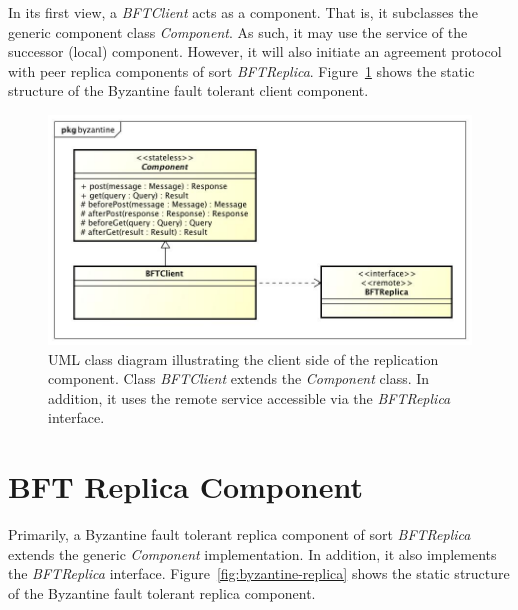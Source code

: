 \documentclass[oneside]{scrreprt}
\newcommand{\fig}[1]{Figure~\ref{#1}}
\begin{document}
In its first view, a \emph{BFTClient} acts as a component.
That is, it subclasses the generic component class
\emph{Component}. As such, it may use the service of
the successor (local) component. However, it will also
initiate an agreement protocol with peer replica
components of sort \emph{BFTReplica}. \fig{fig:byzantine-client}
shows the static structure of the Byzantine fault tolerant client
component.

\begin{figure}[ht]
\centerline{
\includegraphics[width=1.0\textwidth]{figs/byzantine-client}}
\caption{UML class diagram illustrating the client side
of the replication component. Class \emph{BFTClient} extends the
\emph{Component} class. In addition, it uses the remote service
accessible via the \emph{BFTReplica} interface.}
\label{fig:byzantine-client}
\end{figure}


\section{BFT Replica Component}

Primarily, a Byzantine fault tolerant replica
component of sort \emph{BFTReplica} extends the
generic \emph{Component} implementation. In addition,
it also implements the \emph{BFTReplica} interface.
\fig{fig:byzantine-replica} shows
the static structure of the Byzantine fault tolerant replica
component.
\end{document}

